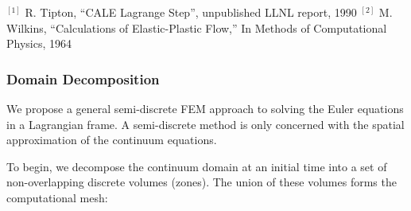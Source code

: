 \documentclass[8pt,xcolor=svgnames]{beamer}
\begin{document}
\begin{frame}
\tiny{
$^{[1]}$ R. Tipton, “CALE Lagrange Step”, unpublished LLNL report, 1990\newline
$^{[2]}$ M. Wilkins, “Calculations of Elastic-Plastic Flow,” In Methods of Computational Physics, 1964}
\end{frame}

\begin{frame}%
 \frametitle{Domain Decomposition}
 \medskip
 We propose a general semi-discrete FEM approach to solving the Euler equations in a Lagrangian frame.  A semi-discrete method is only concerned with the spatial approximation of the continuum equations.
 
To begin, we decompose the continuum domain at an initial time into a set of non-overlapping discrete volumes (zones). The union of these volumes forms the computational mesh: 


\end{frame}
\end{document}
